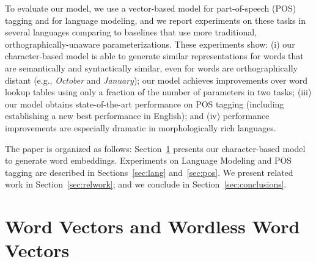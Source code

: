 \documentclass[11pt]{article}
\newcommand{\ignore}[1]{}
\newcommand{\examp}[1]{\emph{#1}}
\begin{document}
\begin{CJK*}{UTF8}{gbsn}
To evaluate our model, we use a vector-based model for part-of-speech (POS) tagging and for language modeling, and we report experiments on these tasks in several languages comparing to baselines that use more traditional, orthographically-unaware parameterizations. These experiments show: (i) our character-based model is able to generate similar representations for words that are semantically and syntactically similar, even for words are orthographically distant (e.g., \examp{October} and \examp{January}); our model achieves improvements over word lookup tables using only a fraction of the number of parameters in two tasks; (iii) our model obtains state-of-the-art performance on POS tagging (including establishing a new best performance in English); and (iv) performance improvements are especially dramatic in morphologically rich languages.







The paper is organized as follows:  Section~\ref{sec:c2v} presents our character-based model to generate word embeddings. Experiments on Language Modeling and POS tagging are described in Sections~\ref{sec:lang} and~\ref{sec:pos}. We present related work in Section~\ref{sec:relwork}; and we conclude in Section~\ref{sec:conclusions}.

\section{Word Vectors and Wordless Word Vectors}
\label{sec:c2v}
\ignore{Most NLP methods convert words into a sparse representation, where word types are treated independently. For instance, multinomial distributions that compute the probability of word  being labelled as class  are generally modelled with a table containing an a row for each word type and a column for each possible class. Similarly, in logistic regression a word is converted into ont-hot representation , which is a vector with the size of the vocabulary  and contains the value 1 in index  and zero in all other indexes. As a softmax is performed on this vector, each position of the vector is given its own set of parameters. Thus, in both approaches, the number of parameters required to learn the model is , where  and  are the vocabulary and set of output classes. The obvious drawback of this representation is that if  is very large (e.g., order of millions) it would be computationally expensive to store the parameters in memory. This is why, most unsupervised methods that are trained on large amounts of data, such as Brown Clustering, which requires a multinomial from word types to each cluster, prunes the vocabulary to a tractable size, leading to losses in terms of coverage. Additionally, the independence assumption leads to sparcity problems. As implied by the Zipf's law, only a relatively small number of word types will actually occur frequently enough for the models to generalize, while most word types will rarely occur leading to overfitting. 

}
\end{CJK*}
\end{document}
